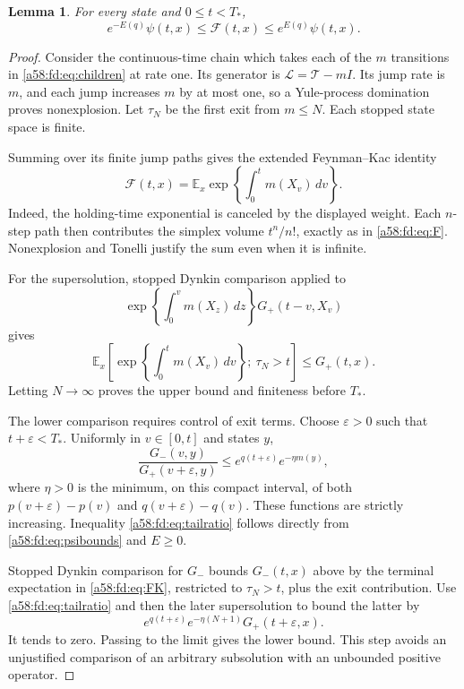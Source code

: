 \documentclass[11pt,letterpaper]{article}
\newtheorem{lemma}[theorem]{Lemma}
\theoremstyle{remark}
\newcommand{\TT}{\mathcal T}
\newcommand{\E}{\mathbb E}
\begin{document}
\begin{lemma}\label{a58:fd:lem:comparison}
For every state and $0\le t<T_*$,
\begin{equation}\label{a58:fd:eq:comparison}
 e^{-E(q)}\psi(t,x)\le\mathcal F(t,x)\le e^{E(q)}\psi(t,x).
\end{equation}
\end{lemma}
\begin{proof}
Consider the continuous-time chain which takes each of the $m$ transitions in \eqref{a58:fd:eq:children} at rate one. Its generator is $\mathcal L=\TT-mI$. Its jump rate is $m$, and each jump increases $m$ by at most one, so a Yule-process domination proves nonexplosion. Let $\tau_N$ be the first exit from $m\le N$. Each stopped state space is finite.

Summing over its finite jump paths gives the extended Feynman--Kac identity
\begin{equation}\label{a58:fd:eq:FK}
 \mathcal F(t,x)=\E_x\exp\left\{\int_0^t m(X_v)\,dv\right\}.
\end{equation}
Indeed, the holding-time exponential is canceled by the displayed weight. Each $n$-step path then contributes the simplex volume $t^n/n!$, exactly as in \eqref{a58:fd:eq:F}. Nonexplosion and Tonelli justify the sum even when it is infinite.

For the supersolution, stopped Dynkin comparison applied to
\[
 \exp\left\{\int_0^v m(X_z)\,dz\right\}G_+(t-v,X_v)
\]
gives
\[
 \E_x\left[\exp\left\{\int_0^t m(X_v)\,dv\right\};\ \tau_N>t\right]
 \le G_+(t,x).
\]
Letting $N\to\infty$ proves the upper bound and finiteness before $T_*$.

The lower comparison requires control of exit terms. Choose $\varepsilon>0$ such that $t+\varepsilon<T_*$. Uniformly in $v\in[0,t]$ and states $y$,
\begin{equation}\label{a58:fd:eq:tailratio}
 \frac{G_-(v,y)}{G_+(v+\varepsilon,y)}
 \le e^{q(t+\varepsilon)}e^{-\eta m(y)},
\end{equation}
where $\eta>0$ is the minimum, on this compact interval, of both
$p(v+\varepsilon)-p(v)$ and $q(v+\varepsilon)-q(v)$. These functions are strictly increasing. Inequality \eqref{a58:fd:eq:tailratio} follows directly from \eqref{a58:fd:eq:psibounds} and $E\ge0$.

Stopped Dynkin comparison for $G_-$ bounds $G_-(t,x)$ above by the terminal expectation in \eqref{a58:fd:eq:FK}, restricted to $\tau_N>t$, plus the exit contribution. Use \eqref{a58:fd:eq:tailratio} and then the later supersolution to bound the latter by
\[
 e^{q(t+\varepsilon)}e^{-\eta(N+1)}G_+(t+\varepsilon,x).
\]
It tends to zero. Passing to the limit gives the lower bound. This step avoids an unjustified comparison of an arbitrary subsolution with an unbounded positive operator.
\end{proof}
\end{document}
